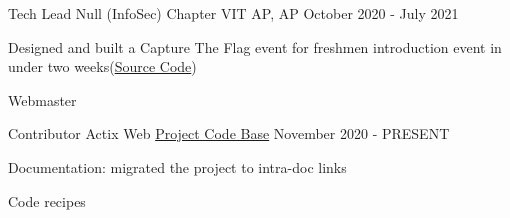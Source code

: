 \begin{cventries}
  \cventry
    {Tech Lead} %
    {Null (InfoSec) Chapter} %
    {VIT AP, AP} %
    {October 2020 - July 2021} %
    {
      \begin{cvitems} %
        \item {Designed and built a Capture The Flag event for freshmen introduction event in under two weeks(\href{https://github.com/realaravinth/hunion-backend}{Source Code}})
       \item {Webmaster}
      \end{cvitems}
    }
    
    \cventry
    {Contributor} %
    {Actix Web} %
    {\href{https://github.com/actix/}{Project Code Base}} %
    {November 2020 - PRESENT} %
    {
      \begin{cvitems}%
        \item {Documentation: migrated the project to intra-doc links}
        \item {Code recipes}
       \end{cvitems}
    }
\end{cventries}

